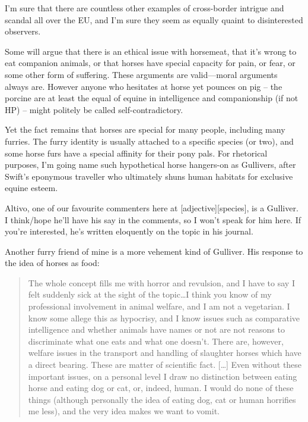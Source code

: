 I'm sure that there are countless other examples of cross-border intrigue and scandal all over the EU, and I'm sure they seem as equally quaint to disinterested observers.

Some will argue that there is an ethical issue with horsemeat, that it's wrong to eat companion animals, or that horses have special capacity for pain, or fear, or some other form of suffering. These arguments are valid—moral arguments always are. However anyone who hesitates at horse yet pounces on pig -- the porcine are at least the equal of equine in intelligence and companionship (if not HP) -- might politely be called self-contradictory.

Yet the fact remains that horses are special for many people, including many furries. The furry identity is usually attached to a specific species (or two), and some horse furs have a special affinity for their pony pals. For rhetorical purposes, I'm going name such hypothetical horse hangers-on as Gullivers, after Swift's eponymous traveller who ultimately shuns human habitats for exclusive equine esteem.

Altivo, one of our favourite commenters here at [adjective][species], is a Gulliver. I think/hope he'll have his say in the comments, so I won't speak for him here. If you're interested, he's written eloquently on the topic in his journal.

Another furry friend of mine is a more vehement kind of Gulliver. His response to the idea of horses as food:

\begin{quote}
  The whole concept fills me with horror and revulsion, and I have to say I felt suddenly sick at the sight of the topic\ldots I think you know of my professional involvement in animal welfare, and I am not a vegetarian. I know some allege this as hypocrisy, and I know issues such as comparative intelligence and whether animals have names or not are not reasons to discriminate what one eats and what one doesn't. There are, however, welfare issues in the transport and handling of slaughter horses which have a direct bearing. These are matter of scientific fact. [\ldots] Even without these important issues, on a personal level I draw no distinction between eating horse and eating dog or cat, or, indeed, human. I would do none of these things (although personally the idea of eating dog, cat or human horrifies me less), and the very idea makes we want to vomit.
\end{quote}

